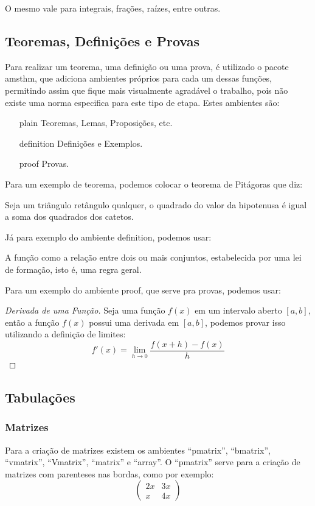 O mesmo vale para integrais, frações, raízes, entre outras.

\subsection{Teoremas, Definições e Provas}
Para realizar um teorema, uma definição ou uma prova, é utilizado o pacote amsthm, que adiciona ambientes próprios para cada um dessas funções, permitindo assim que fique mais visualmente agradável o trabalho, pois não existe uma norma especifica para este tipo de etapa. Estes ambientes são:
\begin{itemize}
	\item [plain] Teoremas, Lemas, Proposições, etc.
	\item [definition] Definições e Exemplos.
	\item [proof] Provas.
\end{itemize}

Para um exemplo de teorema, podemos colocar o teorema de Pitágoras que diz:
\begin{plain}
	Seja um triângulo retângulo qualquer, o quadrado do valor da hipotenusa é igual a soma dos quadrados dos catetos.
\end{plain}

Já para exemplo do ambiente definition, podemos usar:
\begin{definition}
	A função como a relação entre dois ou mais conjuntos, estabelecida por uma lei de formação, isto é, uma regra geral.
\end{definition}

Para um exemplo do ambiente proof, que serve pra provas, podemos usar:

\begin{proof}[Derivada de uma Função]
	Seja uma função $f(x)$ em um intervalo aberto $[a,b]$, então a função $f(x)$ possui uma derivada em $[a,b]$, podemos provar isso utilizando a definição de limites:
	\[
		f'(x) = \lim_{h\rightarrow 0} \frac{f(x + h) - f(x)}{h}
	\]
\end{proof}
\subsection{Tabulações}
\subsubsection{Matrizes}
Para a criação de matrizes existem os ambientes ``pmatrix'', ``bmatrix'', ``vmatrix'', ``Vmatrix'', ``matrix'' e ``array''. O ``pmatrix'' serve para a criação de matrizes com parenteses nas bordas, como por exemplo:
\[
\begin{pmatrix}
	2x & 3x \\ 
	x & 4x
\end{pmatrix} 
\]

